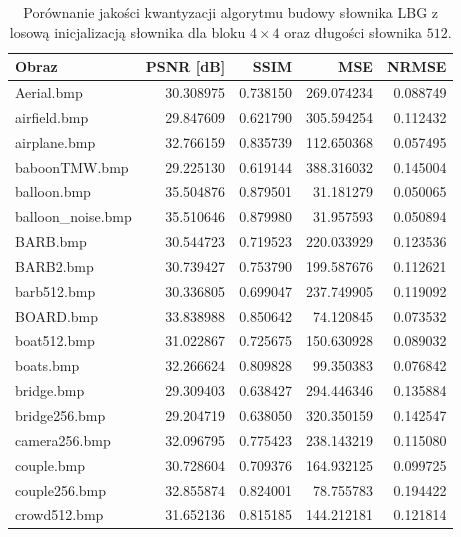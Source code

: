 \documentclass{article}
\begin{document}
\begin{table}[!ht]
  \caption{Porównanie jakości kwantyzacji algorytmu budowy słownika LBG z losową inicjalizacją słownika dla bloku $4 \times 4$ oraz długości słownika $512$.}
  \label{tab:lbg_random}
  \centering
  \begin{tabular}{@{}lrrrr@{}}
    \toprule
    Obraz              & PSNR {[}dB{]} & SSIM     & MSE        & NRMSE    \\ \midrule
    Aerial.bmp         & 30.308975     & 0.738150 & 269.074234 & 0.088749 \\
    airfield.bmp       & 29.847609     & 0.621790 & 305.594254 & 0.112432 \\
    airplane.bmp       & 32.766159     & 0.835739 & 112.650368 & 0.057495 \\
    baboonTMW.bmp      & 29.225130     & 0.619144 & 388.316032 & 0.145004 \\
    balloon.bmp        & 35.504876     & 0.879501 & 31.181279  & 0.050065 \\
    balloon\_noise.bmp & 35.510646     & 0.879980 & 31.957593  & 0.050894 \\
    BARB.bmp           & 30.544723     & 0.719523 & 220.033929 & 0.123536 \\
    BARB2.bmp          & 30.739427     & 0.753790 & 199.587676 & 0.112621 \\
    barb512.bmp        & 30.336805     & 0.699047 & 237.749905 & 0.119092 \\
    BOARD.bmp          & 33.838988     & 0.850642 & 74.120845  & 0.073532 \\
    boat512.bmp        & 31.022867     & 0.725675 & 150.630928 & 0.089032 \\
    boats.bmp          & 32.266624     & 0.809828 & 99.350383  & 0.076842 \\
    bridge.bmp         & 29.309403     & 0.638427 & 294.446346 & 0.135884 \\
    bridge256.bmp      & 29.204719     & 0.638050 & 320.350159 & 0.142547 \\
    camera256.bmp      & 32.096795     & 0.775423 & 238.143219 & 0.115080 \\
    couple.bmp         & 30.728604     & 0.709376 & 164.932125 & 0.099725 \\
    couple256.bmp      & 32.855874     & 0.824001 & 78.755783  & 0.194422 \\
    crowd512.bmp       & 31.652136     & 0.815185 & 144.212181 & 0.121814 \\

\end{tabular}
\end{table}
\end{document}
